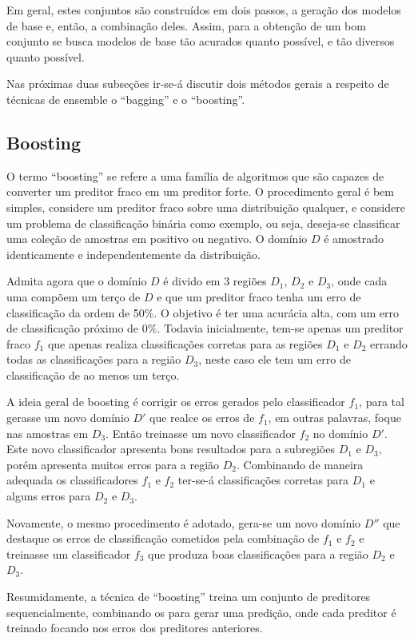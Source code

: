 Em geral, estes conjuntos são construídos em dois passos, a geração dos modelos de base e, então, a combinação deles. Assim, para a obtenção de um bom conjunto se busca modelos de base tão acurados quanto possível, e tão diversos quanto possível.

Nas próximas duas subseções ir-se-á discutir dois métodos gerais a respeito de técnicas de ensemble o ``bagging'' e o ``boosting''.

\subsection{Boosting}

O termo ``boosting'' se refere a uma família de algoritmos que são capazes de converter um preditor fraco em um preditor forte. O procedimento geral é bem simples, considere um preditor fraco sobre uma distribuição qualquer, e considere um problema de classificação binária como exemplo, ou seja, deseja-se classificar uma coleção de amostras em positivo ou negativo. O domínio $D$ é amostrado identicamente e independentemente da distribuição.

Admita agora que o domínio $D$ é divido em 3 regiões $D_1$, $D_2$ e $D_3$, onde cada uma compõem um terço de $D$ e que um preditor fraco tenha um erro de classificação da ordem de 50\%. O objetivo é ter uma acurácia alta, com um erro de classificação próximo de 0\%. Todavia inicialmente, tem-se apenas um preditor fraco $f_1$ que apenas realiza classificações corretas para as regiões $D_1$ e $D_2$ errando todas as classificações para a região $D_3$, neste caso ele tem um erro de classificação de ao menos um terço.

A ideia geral de boosting é corrigir os erros gerados pelo classificador $f_1$, para tal gerasse um novo domínio $D'$ que realce os erros de $f_1$, em outras palavras, foque nas amostras em $D_3$. Então treinasse um novo classificador $f_2$  no domínio $D'$. Este novo classificador apresenta bons resultados para a subregiões $D_1$ e $D_3$, porém apresenta muitos erros para a região $D_2$. Combinando de maneira adequada os classificadores $f_1$ e $f_2$ ter-se-á classificações corretas para $D_1$ e alguns erros para $D_2$ e $D_3$.

Novamente, o mesmo procedimento é adotado, gera-se um novo domínio $D''$ que destaque os erros de classificação cometidos pela combinação de $f_1$ e $f_2$ e treinasse um classificador $f_3$ que produza boas classificações para a região $D_2$ e $D_3$.

Resumidamente, a técnica de ``boosting'' treina um conjunto de preditores sequencialmente, combinando os para gerar uma predição, onde cada preditor é treinado focando nos erros dos preditores anteriores.

